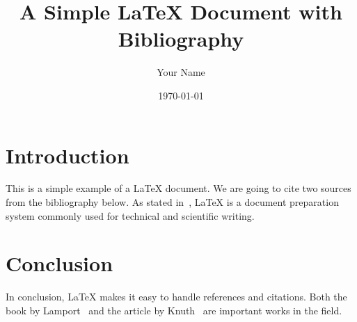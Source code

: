 \documentclass{article}
\title{A Simple LaTeX Document with Bibliography}
\author{Your Name}
\date{\today}
\begin{document}
\maketitle

\section{Introduction}

This is a simple example of a LaTeX document. We are going to cite two sources from the bibliography below. As stated in~\cite{lamport1994}, LaTeX is a document preparation system commonly used for technical and scientific writing.


\section{Conclusion}

In conclusion, LaTeX makes it easy to handle references and citations. Both the book by Lamport~\cite{lamport1994} and the article by Knuth~\cite{knuth1984} are important works in the field.

\printbibliography
\end{document}
